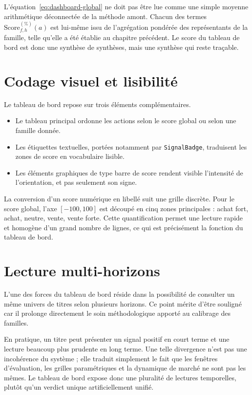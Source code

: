 L'équation~\ref{eq:dashboard-global} ne doit pas être lue comme une simple
moyenne arithmétique déconnectée de la méthode amont. Chacun des termes
\(\mathrm{Score}^{(\%)}_{f,h}(a)\) est lui-même issu de l'agrégation pondérée
des représentants de la famille, telle qu'elle a été établie au chapitre
précédent. Le score du tableau de bord est donc une synthèse de synthèses,
mais une synthèse qui reste traçable.

\section{Codage visuel et lisibilité}
Le tableau de bord repose sur trois éléments complémentaires.
\begin{itemize}
\item Le tableau principal ordonne les actions selon le score global ou selon une
famille donnée.
\item Les étiquettes textuelles, portées notamment par \texttt{SignalBadge},
traduisent les zones de score en vocabulaire lisible.
\item Les éléments graphiques de type barre de score rendent visible l'intensité
de l'orientation, et pas seulement son signe.
\end{itemize}

La conversion d'un score numérique en libellé suit une grille discrète. Pour le
score global, l'axe \([-100,100]\) est découpé en cinq zones principales :
achat fort, achat, neutre, vente, vente forte. Cette quantification permet une
lecture rapide et homogène d'un grand nombre de lignes, ce qui est précisément la
fonction du tableau de bord.

\section{Lecture multi-horizons}
L'une des forces du tableau de bord réside dans la possibilité de consulter un
même univers de titres selon plusieurs horizons. Ce point mérite d'être souligné
car il prolonge directement le soin méthodologique apporté au calibrage des
familles.

En pratique, un titre peut présenter un signal positif en court terme et une
lecture beaucoup plus prudente en long terme. Une telle divergence n'est pas une
incohérence du système ; elle traduit simplement le fait que les fenêtres
d'évaluation, les grilles paramétriques et la dynamique de marché ne sont pas les
mêmes. Le tableau de bord expose donc une pluralité de lectures temporelles,
plutôt qu'un verdict unique artificiellement unifié.

